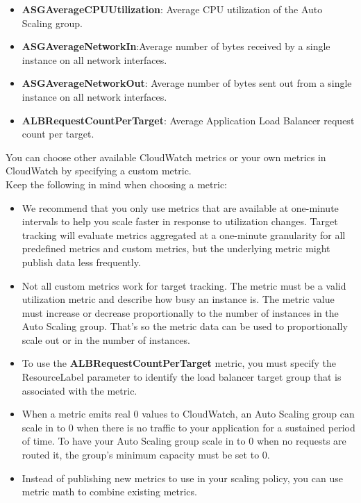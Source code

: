 \documentclass[12pt, letterpaper, twoside]{article}
\begin{document}
\begin{itemize}
	\item \textbf{ASGAverageCPUUtilization}: Average CPU utilization of the Auto Scaling group.
	\item \textbf{ASGAverageNetworkIn}:Average number of bytes received by a single instance on all network interfaces.
	\item \textbf{ASGAverageNetworkOut}: Average number of bytes sent out from a single instance on all network interfaces.
	\item \textbf{ALBRequestCountPerTarget}: Average Application Load Balancer request count per target.
\end{itemize}

You can choose other available CloudWatch metrics or your own metrics in CloudWatch by specifying a custom metric.\\

Keep the following in mind when choosing a metric:
\begin{itemize}
	\item We recommend that you only use metrics that are available at one-minute intervals to help you scale faster in 
		response to utilization changes. Target tracking will evaluate metrics aggregated at a one-minute granularity for 
		all predefined metrics and custom metrics, but the underlying metric might publish data less frequently.
	\item Not all custom metrics work for target tracking. The metric must be a valid utilization metric and describe how 
		busy an instance is. The metric value must increase or decrease proportionally to the number of instances in the 
		Auto Scaling group. That's so the metric data can be used to proportionally scale out or in the number of instances.
	\item To use the \textbf{ALBRequestCountPerTarget} metric, you must specify the ResourceLabel parameter to identify the load 
		balancer target group that is associated with the metric.
	\item When a metric emits real 0 values to CloudWatch, an Auto Scaling group can scale in to 0 when there is no traffic to
		your application for a sustained period of time. To have your Auto Scaling group scale in to 0 when no requests are routed 
		it, the group's minimum capacity must be set to 0.
	\item Instead of publishing new metrics to use in your scaling policy, you can use metric math to combine existing metrics.
\end{itemize}
\end{document}
